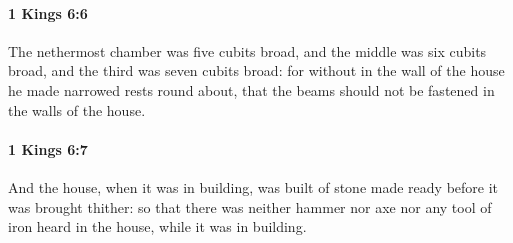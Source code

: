 		\paragraph{1 Kings 6:6} %
			\label{1KINGS-6-6}

			The nethermost chamber was five cubits broad, and the middle was six cubits broad, and the third was seven cubits broad: for without in the wall of the house he made narrowed rests round about, that the beams should not be fastened in the walls of the house.


		\paragraph{1 Kings 6:7} %
			\label{1KINGS-6-7}

			And the house, when it was in building, was built of stone made ready before it was brought thither: so that there was neither hammer nor axe nor any tool of iron heard in the house, while it was in building.

